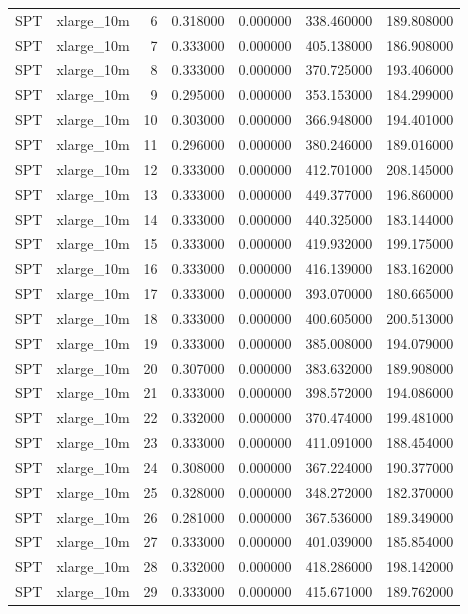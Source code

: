\begin{tabular}{llrrrrr}
SPT & xlarge_10m & 6 & 0.318000 & 0.000000 & 338.460000 & 189.808000 \\
SPT & xlarge_10m & 7 & 0.333000 & 0.000000 & 405.138000 & 186.908000 \\
SPT & xlarge_10m & 8 & 0.333000 & 0.000000 & 370.725000 & 193.406000 \\
SPT & xlarge_10m & 9 & 0.295000 & 0.000000 & 353.153000 & 184.299000 \\
SPT & xlarge_10m & 10 & 0.303000 & 0.000000 & 366.948000 & 194.401000 \\
SPT & xlarge_10m & 11 & 0.296000 & 0.000000 & 380.246000 & 189.016000 \\
SPT & xlarge_10m & 12 & 0.333000 & 0.000000 & 412.701000 & 208.145000 \\
SPT & xlarge_10m & 13 & 0.333000 & 0.000000 & 449.377000 & 196.860000 \\
SPT & xlarge_10m & 14 & 0.333000 & 0.000000 & 440.325000 & 183.144000 \\
SPT & xlarge_10m & 15 & 0.333000 & 0.000000 & 419.932000 & 199.175000 \\
SPT & xlarge_10m & 16 & 0.333000 & 0.000000 & 416.139000 & 183.162000 \\
SPT & xlarge_10m & 17 & 0.333000 & 0.000000 & 393.070000 & 180.665000 \\
SPT & xlarge_10m & 18 & 0.333000 & 0.000000 & 400.605000 & 200.513000 \\
SPT & xlarge_10m & 19 & 0.333000 & 0.000000 & 385.008000 & 194.079000 \\
SPT & xlarge_10m & 20 & 0.307000 & 0.000000 & 383.632000 & 189.908000 \\
SPT & xlarge_10m & 21 & 0.333000 & 0.000000 & 398.572000 & 194.086000 \\
SPT & xlarge_10m & 22 & 0.332000 & 0.000000 & 370.474000 & 199.481000 \\
SPT & xlarge_10m & 23 & 0.333000 & 0.000000 & 411.091000 & 188.454000 \\
SPT & xlarge_10m & 24 & 0.308000 & 0.000000 & 367.224000 & 190.377000 \\
SPT & xlarge_10m & 25 & 0.328000 & 0.000000 & 348.272000 & 182.370000 \\
SPT & xlarge_10m & 26 & 0.281000 & 0.000000 & 367.536000 & 189.349000 \\
SPT & xlarge_10m & 27 & 0.333000 & 0.000000 & 401.039000 & 185.854000 \\
SPT & xlarge_10m & 28 & 0.332000 & 0.000000 & 418.286000 & 198.142000 \\
SPT & xlarge_10m & 29 & 0.333000 & 0.000000 & 415.671000 & 189.762000 \\

\end{tabular}
